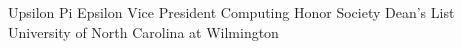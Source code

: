 

\begin{cvhonorsTwo}

  \cvhonorTwo
    {Upsilon Pi Epsilon Vice President}
    {Computing Honor Society}
  \cvhonorTwo
    {Dean's List}
    {University of North Carolina at Wilmington}
\end{cvhonorsTwo}
